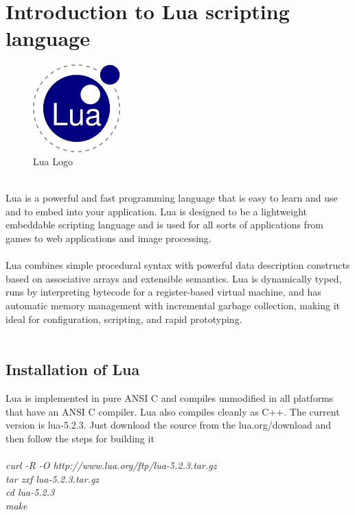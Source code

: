 \section{Introduction to Lua scripting language}
\begin{figure}[!ht]
\centering
\includegraphics[width=0.3\textwidth]{images/lua.png} 
\vspace{-0.5em}
\caption{Lua Logo}
\hspace{-1.5em}
\end{figure}
\leavevmode\\
Lua is a powerful and fast programming language that is easy to learn and use and to embed into your application. Lua is designed to be a lightweight embeddable scripting language and is used for all sorts of applications from games to web applications and image processing.\\\\
Lua combines simple procedural syntax with powerful data description constructs based on associative arrays and extensible semantics. Lua is dynamically typed, runs by interpreting bytecode for a register-based virtual machine, and has automatic memory management with incremental garbage collection, making it ideal for configuration, scripting, and rapid prototyping.\\\\

\subsection{Installation of Lua}
Lua is implemented in pure ANSI C and compiles unmodified in all platforms that have an ANSI C compiler. Lua also compiles cleanly as C++. The current version is lua-5.2.3. Just download the source from the lua.org/download and then follow the steps for building it\\\\
\emph
{curl -R -O http://www.lua.org/ftp/lua-5.2.3.tar.gz\\
tar zxf lua-5.2.3.tar.gz\\
cd lua-5.2.3\\
make
}

